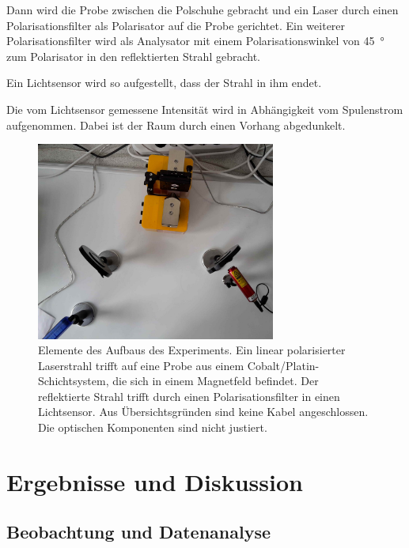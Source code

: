 \documentclass[
	a4paper,
	12pt,
	pagesize,
	ngerman
]{scrartcl}
\begin{document}
	Dann wird die Probe zwischen die Polschuhe gebracht und ein Laser durch einen Polarisationsfilter als Polarisator auf die Probe gerichtet.
	Ein weiterer Polarisationsfilter wird als Analysator mit einem Polarisationswinkel von \SI{45}{\degree} zum Polarisator in den reflektierten Strahl gebracht.%

	Ein Lichtsensor wird so aufgestellt, dass der Strahl in ihm endet.
	
	Die vom Lichtsensor gemessene Intensität wird in Abhängigkeit vom Spulenstrom aufgenommen.
	Dabei ist der Raum durch einen Vorhang abgedunkelt. 
	
	\begin{figure}[H] 
		\includegraphics[width=0.7\textwidth]{O4_Aufbau}
		\centering
		\caption{Elemente des Aufbaus des Experiments. Ein linear polarisierter Laserstrahl trifft auf eine Probe aus einem Cobalt/Platin-Schichtsystem, die sich in einem Magnetfeld befindet. Der reflektierte Strahl trifft durch einen Polarisationsfilter in einen Lichtsensor. Aus Übersichtsgründen sind keine Kabel angeschlossen. Die optischen Komponenten sind nicht justiert.} 
		\label{fig_aufbau}
		\centering
	\end{figure}
	
	\section{Ergebnisse und Diskussion}
	

	\subsection{Beobachtung und Datenanalyse}
\end{document}
